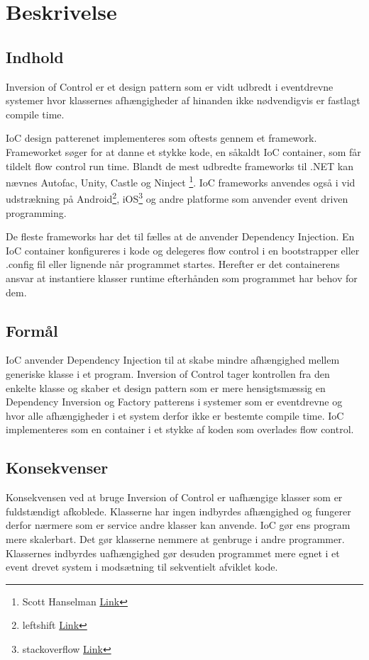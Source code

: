 \thispagestyle{fancy}
\chapter{Beskrivelse}
\label{chp:description}

\section{Indhold}
Inversion of Control er et design pattern som er vidt udbredt i eventdrevne systemer hvor klassernes afhængigheder af hinanden ikke nødvendigvis er fastlagt compile time. 

IoC design patterenet implementeres som oftests gennem et framework. Frameworket søger for at danne et stykke kode, en såkaldt IoC container, som får tildelt flow control run time. Blandt de mest udbredte frameworks til .NET kan nævnes Autofac, Unity, Castle og Ninject \footnote{Scott Hanselman \href{http://www.hanselman.com/blog/ListOfNETDependencyInjectionContainersIOC.aspx}{Link}}. IoC frameworks anvendes også i vid udstrækning på Android\footnote{leftshift \href{http://leftshift.io/android-inversion-of-control-dependency-injection-dagger-part-1}{Link}}, iOS\footnote{stackoverflow \href{http://stackoverflow.com/questions/8782398/recommended-ioc-framework-for-ios}{Link}} og andre platforme som anvender event driven programming.


De fleste frameworks har det til fælles at de anvender Dependency Injection. En IoC container konfigureres i kode og delegeres flow control i en bootstrapper eller .config fil eller lignende når programmet startes. Herefter er det containerens ansvar at instantiere klasser runtime efterhånden som programmet har behov for dem. 

\section{Formål}
IoC anvender Dependency Injection til at skabe mindre afhængighed mellem generiske klasse i et program. Inversion of Control tager kontrollen fra den enkelte klasse og skaber et design pattern som er mere hensigtsmæssig en Dependency Inversion og Factory patterens i systemer som er eventdrevne og hvor alle afhængigheder i et system derfor ikke er bestemte compile time. IoC implementeres som en container i et stykke af koden som overlades flow control.

\section{Konsekvenser}
Konsekvensen ved at bruge Inversion of Control er uafhængige klasser som er fuldstændigt afkoblede. Klasserne har ingen indbyrdes afhængighed og fungerer derfor nærmere som er service andre klasser kan anvende. IoC gør ens program mere skalerbart. Det gør klasserne nemmere at genbruge i andre programmer. Klassernes indbyrdes uafhængighed gør desuden programmet mere egnet i et event drevet system i modsætning til sekventielt afviklet kode.
